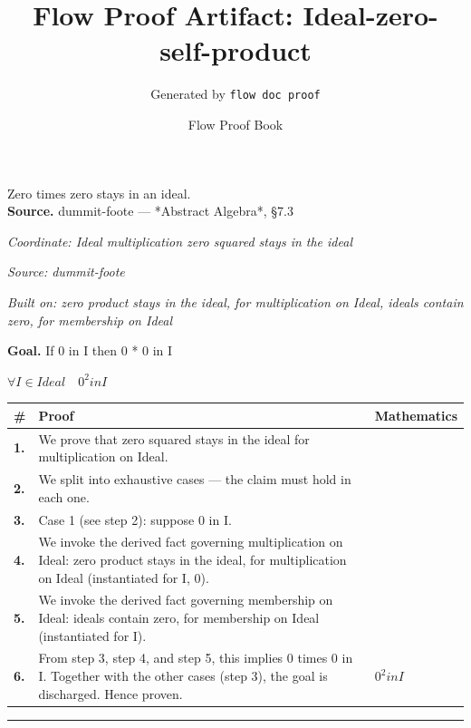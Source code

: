 \documentclass[11pt]{article}
\title{Flow Proof Artifact: Ideal-zero-self-product}
\author{Generated by \texttt{flow doc proof}}
\date{Flow Proof Book}
\theoremstyle{definition}
\begin{document}
\maketitle
Zero times zero stays in an ideal.\\[0.5em]
\textbf{Source.} dummit-foote — *Abstract Algebra*, §7.3\\[0.5em]
\bigskip
{}\par
\smallskip\noindent\textit{Coordinate: Ideal \cdot multiplication \cdot zero squared stays in the ideal}\par
\smallskip\noindent\textit{Source: dummit-foote}\par
\smallskip\noindent\textit{Built on: zero product stays in the ideal, for multiplication on Ideal, ideals contain zero, for membership on Ideal}\par
\medskip
\noindent\textbf{Goal.} If 0 in I then 0 * 0 in I\par
\noindent$\displaystyle \forall I \in Ideal\quad 0^{2} in I$\par
\medskip
\noindent
\begin{tabular}{@{} >{\raggedright\arraybackslash}p{} >{\raggedright\arraybackslash}p{} >{\raggedleft\arraybackslash}p{} @{}}
\textbf{\#} & \textbf{Proof} & \textbf{Mathematics} \\
\midrule
\textbf{1.} & We prove that zero squared stays in the ideal for multiplication on Ideal. & \\[0.45em]
\textbf{2.} & We split into exhaustive cases — the claim must hold in each one. & \\[0.45em]
\textbf{3.} & Case 1 (see step 2): suppose 0 in I. & \\[0.45em]
\textbf{4.} & We invoke the derived fact governing multiplication on Ideal: zero product stays in the ideal, for multiplication on Ideal (instantiated for I, 0). & \\[0.45em]
\textbf{5.} & We invoke the derived fact governing membership on Ideal: ideals contain zero, for membership on Ideal (instantiated for I). & \\[0.45em]
\textbf{6.} & From step 3, step 4, and step 5, this implies 0 times 0 in I. Together with the other cases (step 3), the goal is discharged. Hence proven. & $\displaystyle 0^{2} in I$ \\[0.45em]
\bottomrule
\end{tabular}
\label{thm:Ideal-multiplication-zero_squared_stays_in_the_ideal}
\par\medskip\hrule
\end{document}
